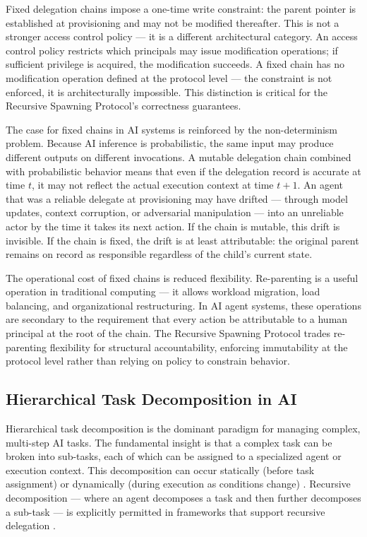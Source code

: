 Fixed delegation chains impose a one-time write constraint: the parent pointer is established at provisioning and may not be modified thereafter. This is not a stronger access control policy — it is a different architectural category. An access control policy restricts which principals may issue modification operations; if sufficient privilege is acquired, the modification succeeds. A fixed chain has no modification operation defined at the protocol level — the constraint is not enforced, it is architecturally impossible. This distinction is critical for the Recursive Spawning Protocol's correctness guarantees.

The case for fixed chains in AI systems is reinforced by the non-determinism problem. Because AI inference is probabilistic, the same input may produce different outputs on different invocations. A mutable delegation chain combined with probabilistic behavior means that even if the delegation record is accurate at time $t$, it may not reflect the actual execution context at time $t+1$. An agent that was a reliable delegate at provisioning may have drifted — through model updates, context corruption, or adversarial manipulation — into an unreliable actor by the time it takes its next action. If the chain is mutable, this drift is invisible. If the chain is fixed, the drift is at least attributable: the original parent remains on record as responsible regardless of the child's current state.

The operational cost of fixed chains is reduced flexibility. Re-parenting is a useful operation in traditional computing — it allows workload migration, load balancing, and organizational restructuring. In AI agent systems, these operations are secondary to the requirement that every action be attributable to a human principal at the root of the chain. The Recursive Spawning Protocol trades re-parenting flexibility for structural accountability, enforcing immutability at the protocol level rather than relying on policy to constrain behavior.

\subsection{Hierarchical Task Decomposition in AI}
\label{sec:hierarchical-decomposition}

Hierarchical task decomposition is the dominant paradigm for managing complex, multi-step AI tasks. The fundamental insight is that a complex task can be broken into sub-tasks, each of which can be assigned to a specialized agent or execution context. This decomposition can occur statically (before task assignment) or dynamically (during execution as conditions change) \cite{tao2025}. Recursive decomposition — where an agent decomposes a task and then further decomposes a sub-task — is explicitly permitted in frameworks that support recursive delegation \cite{tao2025}.

